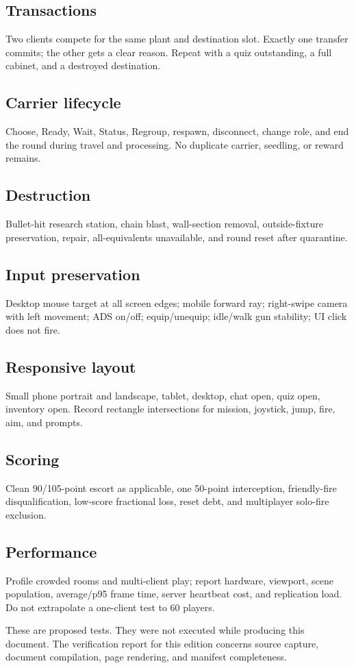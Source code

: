 \subsection{Transactions}
Two clients compete for the same plant and destination slot.\allowbreak{} Exactly one transfer commits; the other gets a clear reason.\allowbreak{} Repeat with a quiz outstanding, a full cabinet, and a destroyed destination.\allowbreak{}

\subsection{Carrier lifecycle}
Choose, Ready, Wait, Status, Regroup, respawn, disconnect, change role, and end the round during travel and processing.\allowbreak{} No duplicate carrier, seedling, or reward remains.\allowbreak{}

\subsection{Destruction}
Bullet-hit research station, chain blast, wall-section removal, outside-fixture preservation, repair, all-equivalents unavailable, and round reset after quarantine.\allowbreak{}

\subsection{Input preservation}
Desktop mouse target at all screen edges; mobile forward ray; right-swipe camera with left movement; ADS on/\allowbreak{}off; equip/\allowbreak{}unequip; idle/\allowbreak{}walk gun stability; UI click does not fire.\allowbreak{}

\subsection{Responsive layout}
Small phone portrait and landscape, tablet, desktop, chat open, quiz open, inventory open.\allowbreak{} Record rectangle intersections for mission, joystick, jump, fire, aim, and prompts.\allowbreak{}

\subsection{Scoring}
Clean 90/\allowbreak{}105-point escort as applicable, one 50-point interception, friendly-fire disqualification, low-score fractional loss, reset debt, and multiplayer solo-fire exclusion.\allowbreak{}

\subsection{Performance}
Profile crowded rooms and multi-client play; report hardware, viewport, scene population, average/\allowbreak{}p95 frame time, server heartbeat cost, and replication load.\allowbreak{} Do not extrapolate a one-client test to 60 players.\allowbreak{}

These are proposed tests.\allowbreak{} They were not executed while producing this document.\allowbreak{} The verification report for this edition concerns source capture, document compilation, page rendering, and manifest completeness.\allowbreak{}


